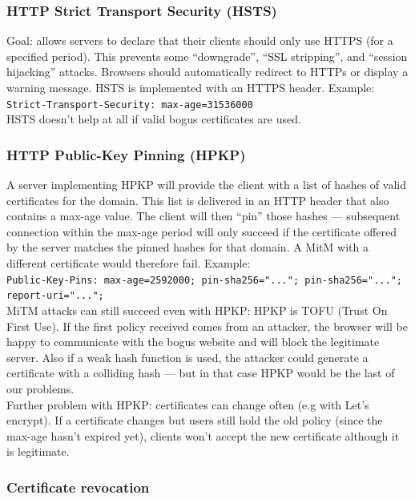 \documentclass[11pt,oneside,a4paper]{article}
\begin{document}
\subsubsection{HTTP Strict Transport Security (HSTS)}

Goal: allows servers to declare that their clients should only use HTTPS (for a specified period). This prevents some “downgrade”, “SSL stripping”, and “session hijacking” attacks. Browsers should automatically redirect to HTTPs or display a warning message. HSTS is implemented with an HTTPS header. Example: \\
\indent \texttt{Strict-Transport-Security: max-age=31536000}\\
\noindent HSTS doesn't help at all if valid bogus certificates are used.

\subsubsection{HTTP Public-Key Pinning (HPKP)}

A server implementing HPKP will provide the client with a list of hashes of valid
certificates for the domain. This list is delivered in an HTTP header that also contains a
max-age value. The client will then “pin” those hashes — subsequent connection within the
max-age period will only succeed if the certificate offered by the server matches the pinned
hashes for that domain. A MitM with a different certificate would therefore fail. Example:\\
\indent \texttt{Public-Key-Pins: max-age=2592000; pin-sha256="..."; pin-sha256="...";\\
	\indent report-uri="...";\\
}
MiTM attacks can still succeed even with HPKP: HPKP is TOFU (Trust On First Use). If the first policy received comes from an
attacker, the browser will be happy to communicate with the bogus website and will block
the legitimate server. Also if a weak hash function is used, the attacker could generate a
certificate with a colliding hash — but in that case HPKP would be the last of our problems.\\

\noindent Further problem with HPKP: certificates can change often (e.g with Let's encrypt). If a certificate changes but users still hold the old policy (since the max-age hasn't expired yet), clients won't accept the new certificate although it is legitimate.

\newpage

\subsubsection{Certificate revocation}
\end{document}
